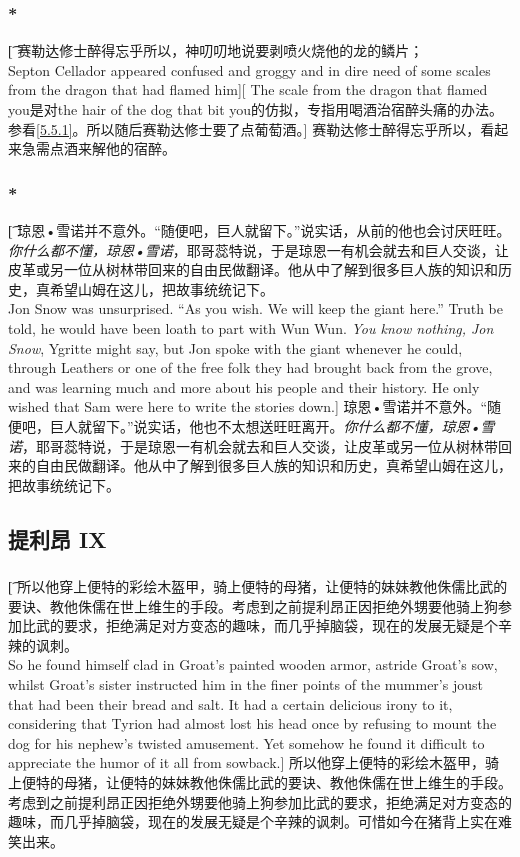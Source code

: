 \documentclass[12pt,a4paper]{article}
\begin{document}
\subsubsection{\color{red}*}\label{5.39.2}\t[
	赛勒达修士醉得忘乎所以，神叨叨地说要剥喷火烧他的龙的鳞片；\\
	Septon Cellador appeared confused and groggy and in dire need of some scales from the dragon that had flamed him][
	The scale from the dragon that flamed you是对the hair of the dog that bit you的仿拟，专指用喝酒治宿醉头痛的办法。参看\ref{5.5.1}。所以随后赛勒达修士要了点葡萄酒。]
	赛勒达修士醉得忘乎所以，看起来急需点酒来解他的宿醉。
	
\subsubsection{\color{red}*}\t[
	琼恩•雪诺并不意外。“随便吧，巨人就留下。”说实话，从前的他也会讨厌旺旺。\emph{你什么都不懂，琼恩•雪诺}，耶哥蕊特说，于是琼恩一有机会就去和巨人交谈，让皮革或另一位从树林带回来的自由民做翻译。他从中了解到很多巨人族的知识和历史，真希望山姆在这儿，把故事统统记下。\\
	Jon Snow was unsurprised. “As you wish. We will keep the giant here.” Truth be told, he would have been loath to part with Wun Wun. \emph{You know nothing, Jon Snow}, Ygritte might say, but Jon spoke with the giant whenever he could, through Leathers or one of the free folk they had brought back from the grove, and was learning much and more about his people and their history. He only wished that Sam were here to write the stories down.]
	琼恩•雪诺并不意外。“随便吧，巨人就留下。”说实话，他也不太想送旺旺离开。\emph{你什么都不懂，琼恩•雪诺}，耶哥蕊特说，于是琼恩一有机会就去和巨人交谈，让皮革或另一位从树林带回来的自由民做翻译。他从中了解到很多巨人族的知识和历史，真希望山姆在这儿，把故事统统记下。
	
\subsection{提利昂 IX}
\subsubsection{}\t[
	所以他穿上便特的彩绘木盔甲，骑上便特的母猪，让便特的妹妹教他侏儒比武的要诀、教他侏儒在世上维生的手段。考虑到之前提利昂正因拒绝外甥要他骑上狗参加比武的要求，拒绝满足对方变态的趣味，而几乎掉脑袋，现在的发展无疑是个辛辣的讽刺。\\
	So he found himself clad in Groat's painted wooden armor, astride Groat's sow, whilst Groat's sister instructed him in the finer points of the mummer's joust that had been their bread and salt. It had a certain delicious irony to it, considering that Tyrion had almost lost his head once by refusing to mount the dog for his nephew's twisted amusement. Yet somehow he found it difficult to appreciate the humor of it all from sowback.]
	所以他穿上便特的彩绘木盔甲，骑上便特的母猪，让便特的妹妹教他侏儒比武的要诀、教他侏儒在世上维生的手段。考虑到之前提利昂正因拒绝外甥要他骑上狗参加比武的要求，拒绝满足对方变态的趣味，而几乎掉脑袋，现在的发展无疑是个辛辣的讽刺。可惜如今在猪背上实在难笑出来。
	
\end{document}
